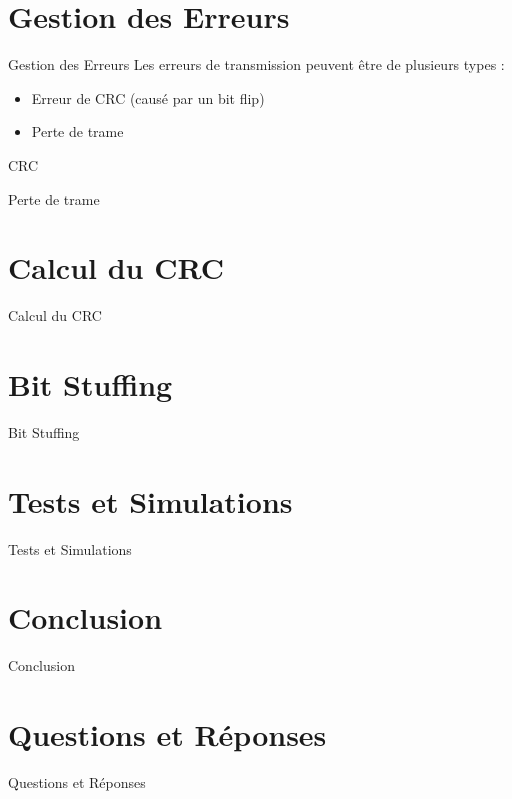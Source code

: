 \documentclass{beamer}
\begin{document}
\section{Gestion des Erreurs}
\begin{frame}{Gestion des Erreurs}
  Les erreurs de transmission peuvent être de plusieurs types : 
  \begin{itemize}
    \item Erreur de CRC (causé par un bit flip)
    \item Perte de trame
  \end{itemize}
\end{frame}
\begin{frame}{CRC} 
\end{frame}
\begin{frame}{Perte de trame} 
\end{frame}



\section{Calcul du CRC}
\begin{frame}{Calcul du CRC}

\end{frame}

\section{Bit Stuffing}
\begin{frame}{Bit Stuffing}

\end{frame}

\section{Tests et Simulations}
\begin{frame}{Tests et Simulations}

\end{frame}

\section{Conclusion}
\begin{frame}{Conclusion}

\end{frame}

\section{Questions et Réponses}
\begin{frame}{Questions et Réponses}

\end{frame}
\end{document}
